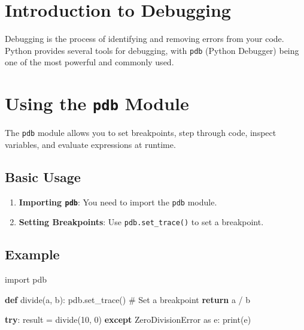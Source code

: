 \documentclass[
  letterpaper,
  DIV=11,
  numbers=noendperiod]{scrreprt}
\newenvironment{Shaded}{\begin{snugshade}}{\end{snugshade}}
\newcommand{\BuiltInTok}[1]{\textcolor[rgb]{0.00,0.23,0.31}{#1}}
\newcommand{\CommentTok}[1]{\textcolor[rgb]{0.37,0.37,0.37}{#1}}
\newcommand{\ControlFlowTok}[1]{\textcolor[rgb]{0.00,0.23,0.31}{\textbf{#1}}}
\newcommand{\DecValTok}[1]{\textcolor[rgb]{0.68,0.00,0.00}{#1}}
\newcommand{\ImportTok}[1]{\textcolor[rgb]{0.00,0.46,0.62}{#1}}
\newcommand{\KeywordTok}[1]{\textcolor[rgb]{0.00,0.23,0.31}{\textbf{#1}}}
\newcommand{\NormalTok}[1]{\textcolor[rgb]{0.00,0.23,0.31}{#1}}
\newcommand{\OperatorTok}[1]{\textcolor[rgb]{0.37,0.37,0.37}{#1}}
\newcommand{\PreprocessorTok}[1]{\textcolor[rgb]{0.68,0.00,0.00}{#1}}
\providecommand{\tightlist}{%
  \setlength{\itemsep}{0pt}\setlength{\parskip}{0pt}}\usepackage{longtable,booktabs,array}
\begin{document}
\section{Introduction to Debugging}\label{introduction-to-debugging}

Debugging is the process of identifying and removing errors from your
code. Python provides several tools for debugging, with \texttt{pdb}
(Python Debugger) being one of the most powerful and commonly used.

\section{\texorpdfstring{Using the \texttt{pdb}
Module}{Using the pdb Module}}\label{using-the-pdb-module}

The \texttt{pdb} module allows you to set breakpoints, step through
code, inspect variables, and evaluate expressions at runtime.

\subsection{Basic Usage}\label{basic-usage}

\begin{enumerate}
\def\labelenumi{\arabic{enumi}.}
\tightlist
\item
  \textbf{Importing \texttt{pdb}}: You need to import the \texttt{pdb}
  module.
\item
  \textbf{Setting Breakpoints}: Use \texttt{pdb.set\_trace()} to set a
  breakpoint.
\end{enumerate}

\subsection{Example}\label{example-6}

\begin{Shaded}
\begin{Highlighting}[]
\ImportTok{import}\NormalTok{ pdb}

\KeywordTok{def}\NormalTok{ divide(a, b):}
\NormalTok{    pdb.set\_trace()  }\CommentTok{\# Set a breakpoint}
    \ControlFlowTok{return}\NormalTok{ a }\OperatorTok{/}\NormalTok{ b}

\ControlFlowTok{try}\NormalTok{:}
\NormalTok{    result }\OperatorTok{=}\NormalTok{ divide(}\DecValTok{10}\NormalTok{, }\DecValTok{0}\NormalTok{)}
\ControlFlowTok{except} \PreprocessorTok{ZeroDivisionError} \ImportTok{as}\NormalTok{ e:}
    \BuiltInTok{print}\NormalTok{(e)}
\end{Highlighting}
\end{Shaded}
\end{document}
